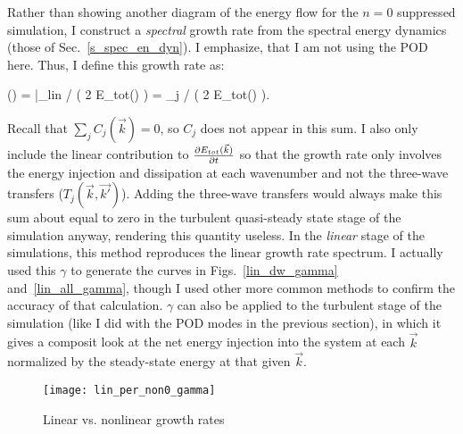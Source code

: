 Rather than showing another diagram of the energy flow for the $n=0$ suppressed simulation, I construct a \emph{spectral} growth rate from the spectral energy dynamics 
(those of Sec.~\ref{s_spec_en_dyn}). I emphasize, that I am not using the POD here. Thus, I define this growth rate as:

\beq
\label{gamma_def}
\gamma() =  \bigg|_{lin} \bigg/ \left( 2 E_{tot}() \right) = \sum_j  \bigg/ \left( 2 E_{tot}() \right).
\eeq

Recall that $\sum_j C_j(\vec{k}) = 0$, so $C_j$ does not appear in this sum. I also only include the linear contribution to $ \frac{\partial E_{tot}({\vec{k}})}{\partial t}$ so that the growth rate
only involves the energy injection and dissipation at each wavenumber and not the three-wave transfers ($T_j(\vec{k},\vec{k'})$). 
Adding the three-wave transfers would always make this sum about equal to zero in the turbulent
quasi-steady state stage of the simulation anyway, rendering this quantity useless. 
In the \emph{linear} stage of the simulations, this method reproduces the linear growth rate spectrum.
I actually used this $\gamma$ to generate the curves in Figs.~\ref{lin_dw_gamma} and~\ref{lin_all_gamma}, though I used other more common methods to confirm the accuracy of that calculation.
$\gamma$ can also be applied to the turbulent stage of the simulation (like I did with the POD modes in the previous section), 
in which it gives a composit look at the net energy injection into the system at each $\vec{k}$ normalized
by the steady-state energy at that given $\vec{k}$.

\begin{figure}[!ht]
\centerline{\texttt{[image: lin\_per\_non0\_gamma]}}
\caption{Linear vs. nonlinear growth rates}
\label{lin_per_non0_gamma}
\end{figure}

